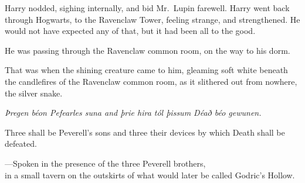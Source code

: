 Harry nodded, sighing internally, and bid Mr.~Lupin farewell.
\sbreak
Harry went back through Hogwarts, to the Ravenclaw Tower, feeling strange, and 
strengthened. He would not have expected any of that, but it had been all to 
the good.

He was passing through the Ravenclaw common room, on the way to his dorm.

That was when the shining creature came to him, gleaming soft white beneath the 
candlefires of the Ravenclaw common room, as it slithered out from nowhere, the 
silver snake.
\sbreak
\begin{center}
\emph{Þregen béon Pefearles suna and þrie hira 
tól þissum Déað béo gewunen.}

Three shall be Peverell's sons and three their devices by which Death shall be 
defeated.

---Spoken in the presence of the three Peverell brothers,\\
in a small tavern on the outskirts of what would later be called Godric's 
Hollow.
\end{center}
